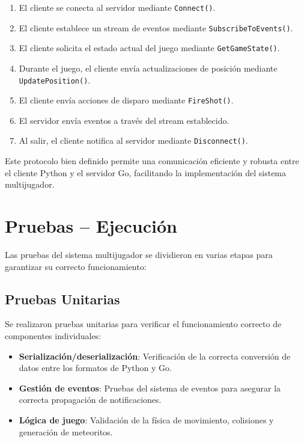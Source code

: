 \documentclass[12pt,letterpaper]{article}
\begin{document}
\begin{enumerate}
    \item El cliente se conecta al servidor mediante \texttt{Connect()}.
    \item El cliente establece un stream de eventos mediante \texttt{SubscribeToEvents()}.
    \item El cliente solicita el estado actual del juego mediante \texttt{GetGameState()}.
    \item Durante el juego, el cliente envía actualizaciones de posición mediante \texttt{UpdatePosition()}.
    \item El cliente envía acciones de disparo mediante \texttt{FireShot()}.
    \item El servidor envía eventos a través del stream establecido.
    \item Al salir, el cliente notifica al servidor mediante \texttt{Disconnect()}.
\end{enumerate}

Este protocolo bien definido permite una comunicación eficiente y robusta entre el cliente Python y el servidor Go, facilitando la implementación del sistema multijugador.

\section{Pruebas – Ejecución}

Las pruebas del sistema multijugador se dividieron en varias etapas para garantizar su correcto funcionamiento:

\subsection{Pruebas Unitarias}

Se realizaron pruebas unitarias para verificar el funcionamiento correcto de componentes individuales:

\begin{itemize}
    \item \textbf{Serialización/deserialización}: Verificación de la correcta conversión de datos entre los formatos de Python y Go.
    \item \textbf{Gestión de eventos}: Pruebas del sistema de eventos para asegurar la correcta propagación de notificaciones.
    \item \textbf{Lógica de juego}: Validación de la física de movimiento, colisiones y generación de meteoritos.
\end{itemize}
\end{document}
